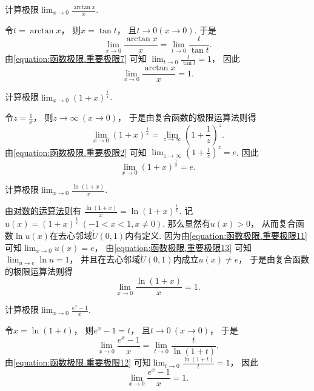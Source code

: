 \begin{example}
计算极限\(\lim_{x\to0} \frac{\arctan x}{x}\).
\begin{solution}
令\(t = \arctan x\)，
则\(x = \tan t\)，
且\(t\to0(x\to0)\).
于是\[
	\lim_{x\to0} \frac{\arctan x}{x}
	= \lim_{t\to0} \frac{t}{\tan t}.
\]
由\cref{equation:函数极限.重要极限7} 可知
\(\lim_{t\to0} \frac{t}{\tan t} = 1\)，
因此\begin{equation}\label{equation:函数极限.重要极限10}
	\lim_{x\to0} \frac{\arctan x}{x} = 1.
\end{equation}
\end{solution}
\end{example}

\begin{example}
计算极限\(\lim_{x\to0} (1+x)^{\frac1x}\).
\begin{solution}
令\(z = \frac1x\)，
则\(z\to\infty\ (x\to0)\)，
于是由复合函数的极限运算法则得\[
	\lim_{x\to0} (1+x)^{\frac1x}
	= \lim_{z\to\infty} \left(1+\frac1z\right)^z.
\]
由\cref{equation:函数极限.重要极限2} 可知
\(\lim_{z\to\infty} \left(1+\frac1z\right)^z = e\).
因此\begin{equation}\label{equation:函数极限.重要极限11}
	\lim_{x\to0} (1+x)^{\frac1x} = e.
\end{equation}
\end{solution}
\end{example}

\begin{example}
计算极限\(\lim_{x\to0} \frac{\ln(1+x)}{x}\).
\begin{solution}
由\hyperref[equation:函数.对数的基本运算法则3]{对数的运算法则}有
\(\frac{\ln(1+x)}{x} = \ln(1+x)^{\frac1x}\).
记\(u(x) = (1+x)^{\frac1x}\ (-1<x<1,x\neq0)\).
那么显然有\(u(x)>0\)，
从而复合函数\(\ln u(x)\)在去心邻域\(\mathring{U}(0,1)\)内有定义.
因为由\cref{equation:函数极限.重要极限11} 可知\(\lim_{x\to0} u(x) = e\)，
由\cref{equation:函数极限.重要极限13} 可知\(\lim_{u\to e} \ln u = 1\)，
并且在去心邻域\(\mathring{U}(0,1)\)内成立\(u(x)\neq e\)，
于是由复合函数的极限运算法则得\begin{equation}\label{equation:函数极限.重要极限12}
	\lim_{x\to0} \frac{\ln(1+x)}{x} = 1.
\end{equation}
\end{solution}
\end{example}

\begin{example}
计算极限\(\lim_{x\to0} \frac{e^x-1}{x}\).
\begin{solution}
令\(x=\ln(1+t)\)，
则\(e^x-1=t\)，
且\(t\to0\ (x\to0)\)，
于是\[
	\lim_{x\to0} \frac{e^x-1}{x}
	= \lim_{t\to0} \frac{t}{\ln(1+t)}.
\]
由\cref{equation:函数极限.重要极限12} 可知\(\lim_{t\to0} \frac{\ln(1+t)}{t} = 1\)，
因此\begin{equation}\label{equation:函数极限.重要极限14}
	\lim_{x\to0} \frac{e^x-1}{x} = 1.
\end{equation}
\end{solution}
\end{example}

